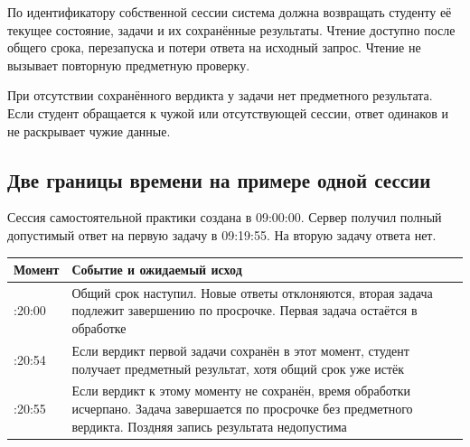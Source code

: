 \documentclass[12pt,a4paper]{article}
\newcounter{none} %
\begin{document}
По идентификатору собственной сессии система должна возвращать студенту её текущее состояние, задачи и их сохранённые результаты. Чтение доступно после общего срока, перезапуска и потери ответа на исходный запрос. Чтение не вызывает повторную предметную проверку.

При отсутствии сохранённого вердикта у задачи нет предметного результата. Если студент обращается к чужой или отсутствующей сессии, ответ одинаков и не раскрывает чужие данные.

\subsection{Две границы времени на примере одной сессии}\label{ux434ux432ux435-ux433ux440ux430ux43dux438ux446ux44b-ux432ux440ux435ux43cux435ux43dux438-ux43dux430-ux43fux440ux438ux43cux435ux440ux435-ux43eux434ux43dux43eux439-ux441ux435ux441ux441ux438ux438}

\hypertarget{две-границы-времени-на-примере-одной-сессии}{}

Сессия самостоятельной практики создана в 09:00:00. Сервер получил полный допустимый ответ на первую задачу в 09:19:55. На вторую задачу ответа нет.

{\def\LTcaptype{none} %
\begin{longtable}[]{@{}
  >{\raggedright\arraybackslash}p{}
  >{\raggedright\arraybackslash}p{}@{}}
\toprule\noalign{}
\begin{minipage}[b]{\linewidth}\raggedright
Момент
\end{minipage} & \begin{minipage}[b]{\linewidth}\raggedright
Событие и ожидаемый исход
\end{minipage} \\
\midrule\noalign{}
\endhead
\bottomrule\noalign{}
\endlastfoot
09:20:00 & Общий срок наступил. Новые ответы отклоняются, вторая задача подлежит завершению по просрочке. Первая задача остаётся в обработке \\
09:20:54 & Если вердикт первой задачи сохранён в этот момент, студент получает предметный результат, хотя общий срок уже истёк \\
09:20:55 & Если вердикт к этому моменту не сохранён, время обработки исчерпано. Задача завершается по просрочке без предметного вердикта. Поздняя запись результата недопустима \\
\end{longtable}
}
\end{document}
